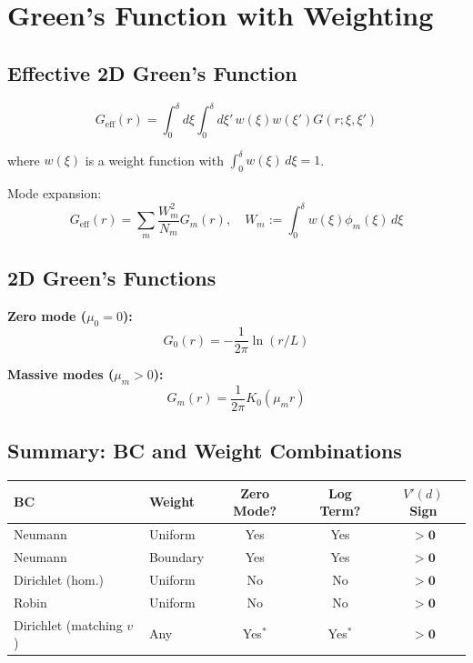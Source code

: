 \documentclass[11pt,a4paper]{article}
\begin{document}
\section{Green's Function with Weighting}
\label{sec:greens-function}

\subsection{Effective 2D Green's Function}

\begin{equation}
G_{\text{eff}}(r) = \int_0^\delta d\xi \int_0^\delta d\xi'\, w(\xi) w(\xi') G(r; \xi, \xi')
\end{equation}

where $w(\xi)$ is a weight function with $\int_0^\delta w(\xi)\,d\xi = 1$.

Mode expansion:
\begin{equation}
G_{\text{eff}}(r) = \sum_m \frac{W_m^2}{N_m} G_m(r), \quad
W_m := \int_0^\delta w(\xi) \phi_m(\xi)\,d\xi
\end{equation}

\subsection{2D Green's Functions}

\textbf{Zero mode ($\mu_0 = 0$):}
\begin{equation}
G_0(r) = -\frac{1}{2\pi} \ln(r/L)
\end{equation}

\textbf{Massive modes ($\mu_m > 0$):}
\begin{equation}
G_m(r) = \frac{1}{2\pi} K_0(\mu_m r)
\end{equation}

\subsection{Summary: BC and Weight Combinations}

\begin{center}
\begin{tabular}{@{}llccc@{}}
\toprule
BC & Weight & Zero Mode? & Log Term? & $V'(d)$ Sign \\
\midrule
Neumann & Uniform & Yes & Yes & $\mathbf{> 0}$ \\
Neumann & Boundary & Yes & Yes & $\mathbf{> 0}$ \\
Dirichlet (hom.) & Uniform & No & No & $\mathbf{> 0}$ \\
Robin & Uniform & No & No & $\mathbf{> 0}$ \\
Dirichlet (matching $v$) & Any & Yes$^*$ & Yes$^*$ & $\mathbf{> 0}$ \\
\bottomrule
\end{tabular}
\end{center}
\end{document}
